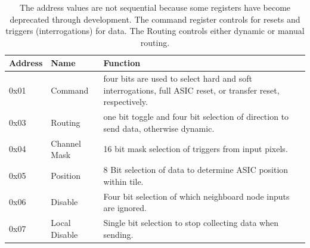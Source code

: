 \begin{table}
\begin{center}
\begin{tabular}{||p{30mm} p{30mm} p{90mm}||}
 \hline
 Address & Name & Function \\ [0.5ex]
 \hline\hline
  0x01 & Command & four bits are used to select hard and soft interrogations, full ASIC reset, or transfer reset, respectively. \\
 \hline
  0x03 & Routing & one bit toggle and four bit selection of direction to send data, otherwise dynamic. \\
 \hline
  0x04 & Channel Mask & 16 bit mask selection of triggers from input pixels. \\
 \hline
  0x05 & Position & 8 Bit selection of data to determine ASIC position within tile. \\
 \hline
  0x06 & Disable & Four bit selection of which neighboard node inputs are ignored. \\
 \hline
  0x07 & Local Disable & Single bit selection to stop collecting data when sending. \\
 \hline
\end{tabular}
\caption{The address values are not sequential because some registers have become deprecated through development.
The command register controls for resets and triggers (interrogations) for data.
The Routing controls either dynamic or manual routing.
}
\end{center}
\end{table}
~\label{table:node_registers}

